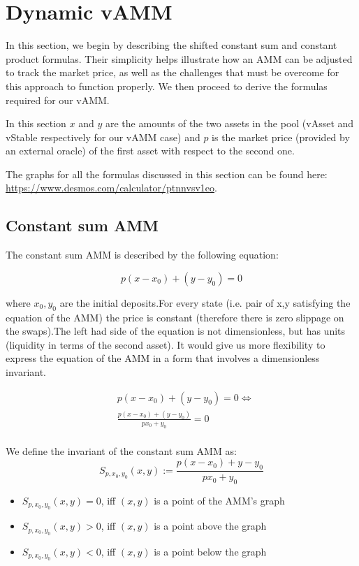 \documentclass{article}
\begin{document}
\section{Dynamic vAMM}\label{vAMM}

In this section, we begin by describing the shifted constant sum and constant product formulas. Their simplicity helps illustrate how an AMM can be adjusted to track the market price, as well as the challenges that must be overcome for this approach to function properly. We then proceed to derive the formulas required for our vAMM.

In this section $x$ and $y$ are the amounts of the two assets in the pool (vAsset and vStable respectively for our vAMM case) and $p$ is the market price (provided by an external oracle) of the first asset with respect to the second one.

The graphs for all the formulas discussed in this section can be found here: \url{https://www.desmos.com/calculator/ptnnvsv1eo}.
\subsection{Constant sum AMM}
The constant sum AMM is described by the following equation:

\begin{equation}
p(x-x_0)+(y-y_0) = 0
\end{equation}

where $x_0,y_0$ are the initial deposits.For every state (i.e. pair of x,y satisfying the equation of the AMM) the price is constant (therefore there is zero slippage on the swaps).The left had side of the equation is not dimensionless, but has units (liquidity in terms of the second asset). It would give us more flexibility to express the equation of the AMM in a form that involves a dimensionless invariant.

\begin{align}
&p(x-x_0)+(y-y_0) = 0 \Leftrightarrow\\
&\frac{p(x-x_0)+(y-y_0)}{px_0+y_0}=0\\
\end{align}

We define the invariant of the constant sum AMM as:
\begin{equation}\label{S invariant}
S_{p,x_0,y_0}(x,y) := \frac{p(x-x_0)+y-y_0}{px_0+y_0} 
\end{equation}

\begin{itemize}
\item $S_{p,x_0,y_0}(x,y) = 0$, iff $(x,y)$ is a point of the AMM's graph
\item $S_{p,x_0,y_0}(x,y) > 0$, iff $(x,y)$ is a point above the graph
\item $S_{p,x_0,y_0}(x,y) < 0$, iff $(x,y)$ is a point below the graph
\end{itemize}
\end{document}
